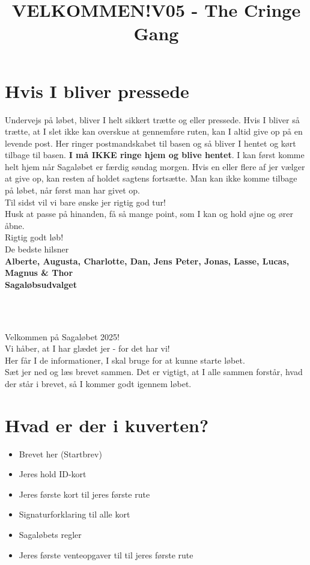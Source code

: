 \section{Hvis I bliver pressede}
Undervejs på løbet, bliver I helt sikkert trætte og eller pressede. Hvis I bliver så trætte, at I slet ikke kan overskue at gennemføre ruten, kan I altid give op på en levende post. Her ringer postmandskabet til basen og så bliver I hentet og kørt tilbage til basen. \textbf{I må IKKE ringe hjem og blive hentet}. I kan først komme helt hjem når Sagaløbet er færdig søndag morgen. Hvis en eller flere af jer vælger at give op, kan resten af holdet sagtens fortsætte. Man kan ikke komme tilbage på løbet, når først man har givet op.\\
\newline
Til sidst vil vi bare ønske jer rigtig god tur!\\
Husk at passe på hinanden, få så mange point, som I kan og hold øjne og ører åbne.\\
\newline
Rigtig godt løb!\\
\newline
\textcolor{søblå}{De bedste hilsner}\\
\textcolor{natblå}{\textbf{Alberte, Augusta, Charlotte, Dan, Jens Peter, Jonas, Lasse, Lucas, Magnus \& Thor}}\\
\textcolor{natblå}{\textbf{Sagaløbsudvalget}}\\
\newpage
\title{VELKOMMEN!}\\
\newline
\title{\textcolor{søblå}{V05 - The Cringe Gang }}\\
\newline
Velkommen på Sagaløbet 2025!\\
Vi håber, at I har glædet jer - for det har vi!\\
Her får I de informationer, I skal bruge for at kunne starte løbet.\\
Sæt jer ned og læs brevet sammen. Det er vigtigt, at I alle sammen forstår, hvad der står i brevet, så I kommer godt igennem løbet.
\section{Hvad er der i kuverten?}
\begin{itemize}
    \item Brevet her (Startbrev)
    \item Jeres hold ID-kort
    \item Jeres første kort til jeres første rute
    \item Signaturforklaring til alle kort
    \item Sagaløbets regler
    \item Jeres første venteopgaver til til jeres første rute
\end{itemize}

